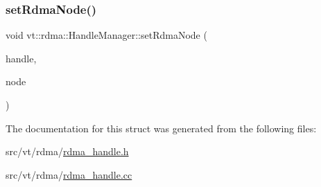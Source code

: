 \subsubsection{\texorpdfstring{set\+Rdma\+Node()}{setRdmaNode()}}
{\footnotesize\ttfamily void vt\+::rdma\+::\+Handle\+Manager\+::set\+Rdma\+Node (\begin{DoxyParamCaption}\item[{\hyperlink{structvt_1_1rdma_1_1_handle_manager_acebfe9aa5887a015cc5da18f4f7e55ae}{R\+D\+M\+A\+\_\+\+Universal\+Id\+Type} \&}]{handle,  }\item[{\hyperlink{namespacevt_a866da9d0efc19c0a1ce79e9e492f47e2}{Node\+Type} const \&}]{node }\end{DoxyParamCaption})\hspace{0.3cm}{\ttfamily [static]}}



The documentation for this struct was generated from the following files\+:\begin{DoxyCompactItemize}
\item 
src/vt/rdma/\hyperlink{rdma__handle_8h}{rdma\+\_\+handle.\+h}\item 
src/vt/rdma/\hyperlink{rdma__handle_8cc}{rdma\+\_\+handle.\+cc}\end{DoxyCompactItemize}
